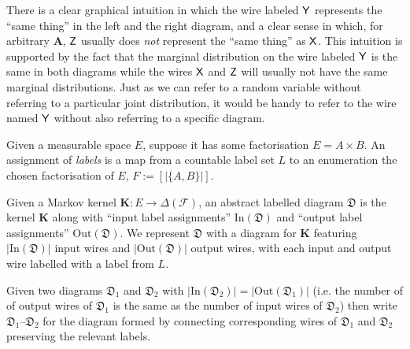 There is a clear graphical intuition in which the wire labeled $\mathsf{Y}$ represents the ``same thing'' in the left and the right diagram, and a clear sense in which, for arbitrary $\mathbf{A}$, $\mathsf{Z}$ usually does \emph{not} represent the ``same thing'' as $\mathsf{X}$. This intuition is supported by the fact that the marginal distribution on the wire labeled $\mathsf{Y}$ is the same in both diagrams while the wires $\mathsf{X}$ and $\mathsf{Z}$ will usually not have the same marginal distributions. Just as we can refer to a random variable without referring to a particular joint distribution, it would be handy to refer to the wire named $\mathsf{Y}$ without also referring to a specific diagram. 


\begin{definition}
Given a measurable space $E$, suppose it has some factorisation $E=A\times B$. An assignment of \emph{labels} is a map from a countable label set $L$ to an enumeration the chosen factorisation of $E$, $F:=[|\{A,B\}|]$. 

Given a Markov kernel $\mathbf{K}:E\to \Delta(\mathcal{F})$, an abstract labelled diagram $\mathfrak{D}$ is the kernel $\mathbf{K}$ along with ``input label assignments'' $\mathrm{In}(\mathfrak{D})$ and ``output label assignments'' $\mathrm{Out}(\mathfrak{D})$. We represent $\mathfrak{D}$ with a diagram for $\mathbf{K}$ featuring $|\mathrm{In}(\mathfrak{D})|$ input wires and $|\mathrm{Out}(\mathfrak{D})|$ output wires, with each input and output wire labelled with a label from $L$.

Given two diagrams $\mathfrak{D}_1$ and $\mathfrak{D}_2$ with $|\mathrm{In}(\mathfrak{D}_2)|=|\mathrm{Out}(\mathfrak{D}_1)|$ (i.e. the number of of output wires of $\mathfrak{D}_1$ is the same as the number of input wires of $\mathfrak{D}_2$) then write $\mathfrak{D}_1 \text{--} \mathfrak{D}_2$ for the diagram formed by connecting corresponding wires of $\mathfrak{D}_1$ and $\mathfrak{D}_2$ preserving the relevant labels.
\end{definition}

